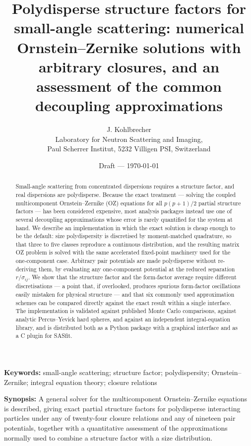 \documentclass[11pt,a4paper]{article}
\title{\bfseries Polydisperse structure factors for small-angle scattering:
numerical Ornstein--Zernike solutions with arbitrary closures, and an
assessment of the common decoupling approximations}
\author{J. Kohlbrecher\\[2pt]
\small Laboratory for Neutron Scattering and Imaging,\\
\small Paul Scherrer Institut, 5232 Villigen PSI, Switzerland}
\date{Draft --- \today}
\begin{document}
\maketitle

\begin{abstract}
\noindent
Small-angle scattering from concentrated dispersions requires a structure
factor, and real dispersions are polydisperse. Because the exact treatment ---
solving the coupled multicomponent Ornstein--Zernike (OZ) equations for all
$p(p+1)/2$ partial structure factors --- has been considered expensive, most
analysis packages instead use one of several decoupling approximations whose
error is rarely quantified for the system at hand. We describe an
implementation in which the exact solution is cheap enough to be the default:
size polydispersity is discretised by moment-matched quadrature, so that three
to five classes reproduce a continuous distribution, and the resulting matrix
OZ problem is solved with the same accelerated fixed-point machinery used for
the one-component case. Arbitrary pair potentials are made polydisperse
without re-deriving them, by evaluating any one-component potential at the
reduced separation $r/\sigma_{ij}$. We show that the structure factor and the
form-factor average require different discretisations --- a point that, if
overlooked, produces spurious form-factor oscillations easily mistaken for
physical structure --- and that six commonly used approximation schemes can be
compared directly against the exact result within a single interface. The
implementation is validated against published Monte Carlo comparisons, against
analytic Percus--Yevick hard spheres, and against an independent
integral-equation library, and is distributed both as a Python package with a
graphical interface and as a C plugin for SASfit.
\end{abstract}

\noindent\textbf{Keywords:} small-angle scattering; structure factor;
polydispersity; Ornstein--Zernike; integral equation theory; closure relations

\bigskip
\noindent\textbf{Synopsis:} A general solver for the multicomponent
Ornstein--Zernike equations is described, giving exact partial structure
factors for polydisperse interacting particles under any of twenty-four
closure
relations and any of nineteen pair potentials, together with a quantitative
assessment of the approximations normally used to combine a structure factor
with a size distribution.
\end{document}
